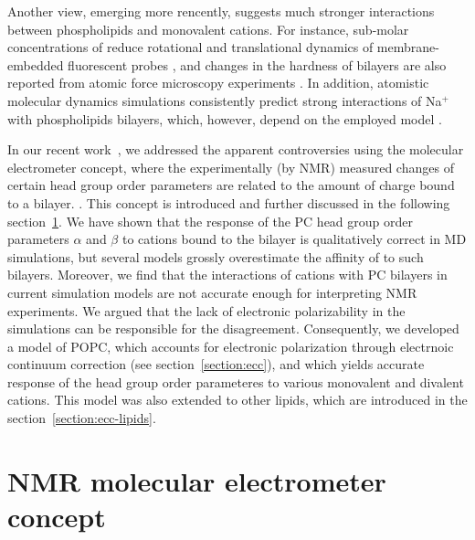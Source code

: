 Another view, emerging more rencently, suggests much stronger interactions between phospholipids and monovalent cations. 
For instance, sub-molar concentrations of  reduce rotational and translational dynamics of membrane-embedded fluorescent probes \citep{bockmann03,vacha09a,harb13}, 
and changes in the hardness of bilayers are also reported from atomic force microscopy experiments \citep{manyes05,manyes06,fukuma07,ferber11,morata12}.
In addition, atomistic molecular dynamics simulations consistently predict strong interactions of Na${^+}$ with phospholipids bilayers,
which, however, depend on the employed model \citep{bockmann03,bockmann04,sachs04,berkowitz06,cordomi08,cordomi09,valley11,berkowitz12}.

In our recent work~\citep{catte16}, we addressed the apparent controversies 
using the molecular electrometer concept, 
where the experimentally (by NMR) measured changes of certain head group order parameters 
are related to the amount of charge bound to a bilayer. \citep{brown77,akutsu81,altenbach84,seelig87,scherer89}.
This concept is introduced and further discussed in the following section~\ref{section:electrometer}. 
We have shown that the response of the PC head group order parameters $\alpha$ and $\beta$ 
to cations bound to the bilayer is qualitatively correct in MD simulations, 
but several models grossly overestimate the affinity of  to such bilayers. 
Moreover, we find that the interactions of  cations with PC bilayers
in current simulation models are not accurate enough for interpreting NMR experiments. 
We argued that the lack of electronic polarizability in the simulations 
can be responsible for the disagreement. 
Consequently, we developed a model of POPC, 
which accounts for electronic polarization through electrnoic continuum correction (see section~\ref{section:ecc}), 
and which yields accurate response of the head group order parameteres to various monovalent and divalent cations. \citep{melcr18}
This model was also extended to other lipids, which are introduced in the section~\ref{section:ecc-lipids}. 









\section{NMR molecular electrometer concept} \label{section:electrometer} 

